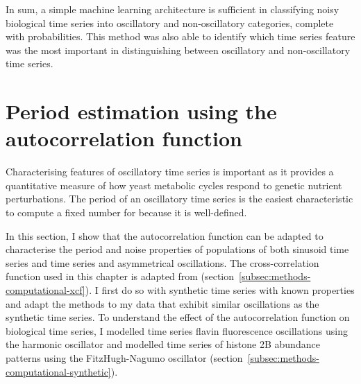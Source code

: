 In sum,
a simple machine learning architecture is sufficient in classifying noisy biological time series into oscillatory and non-oscillatory categories, complete with probabilities.
This method was also able to identify which time series feature was the most important in distinguishing between oscillatory and non-oscillatory time series.


\section{Period estimation using the autocorrelation function}
\label{sec:analysis-characterisation}

Characterising features of oscillatory time series is important as it provides a quantitative measure of how yeast metabolic cycles respond to genetic nutrient perturbations.
The period of an oscillatory time series is the easiest characteristic to compute a fixed number for because it is well-defined.

In this section, I show that the autocorrelation function can be adapted to characterise the period and noise properties of populations of both sinusoid time series and time series and asymmetrical oscillations.
The cross-correlation function used in this chapter is adapted from \textcite{pietschDeterminingGrowthRates2023} (section~\ref{subsec:methods-computational-xcf}).
I first do so with synthetic time series with known properties and adapt the methods to my data that exhibit similar oscillations as the synthetic time series.
To understand the effect of the autocorrelation function on biological time series, I modelled time series flavin fluorescence oscillations using the harmonic oscillator and modelled time series of histone 2B abundance patterns using the FitzHugh-Nagumo oscillator \parencite{fitzhughImpulsesPhysiologicalStates1961} (section~\ref{subsec:methods-computational-synthetic}).

